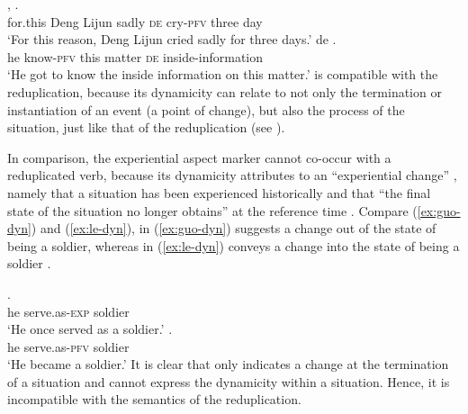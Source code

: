 \settowidth{}

\ea
  \ea\label{ex:cry}
    \gll {},       .\\
    for.this Deng Lijun sadly \textsc{de} cry-\textsc{pfv} three day\\ 
    \glt `For this reason, Deng Lijun cried sadly for three days.'
  \ex\label{ex:know}
    \gll {}    de .\\
    he know-\textsc{pfv} this matter \textsc{de} inside-information\\ 
    \glt `He got to know the inside information on this matter.'
  \z
\z
{} is compatible with the reduplication, because its dynamicity can relate to not only the termination or instantiation of an event (a point of change), but also the process of the situation, just like that of the reduplication (see ).

In comparison, the experiential aspect marker  cannot co\hyp{}occur with a reduplicated verb, 
because its dynamicity attributes to an ``experiential change'' \citep[148]{XiaoMcEnery2004}, 
namely that a situation has been experienced historically and that ``the final state of the situation no longer obtains'' at the reference time \citep[144]{XiaoMcEnery2004}. 
Compare (\ref{ex:guo-dyn}) and (\ref{ex:le-dyn}),  in (\ref{ex:guo-dyn}) suggests a change out of the state of being a soldier, 
whereas  in (\ref{ex:le-dyn}) conveys a change into the state of being a soldier \citep[149]{XiaoMcEnery2004}.

\ea
  \ea\label{ex:guo-dyn}
    \gll {}  .\\
    he serve.as-\textsc{exp} soldier\\ 
    \glt `He once served as a soldier.'
  \ex\label{ex:le-dyn}
    \gll {}  .\\
    he serve.as-\textsc{pfv} soldier\\ 
    \glt `He became a soldier.'
  \z
\z
It is clear that  only indicates a change at the termination of a situation and cannot express the dynamicity within a situation.
Hence, it is incompatible with the semantics of the reduplication.

